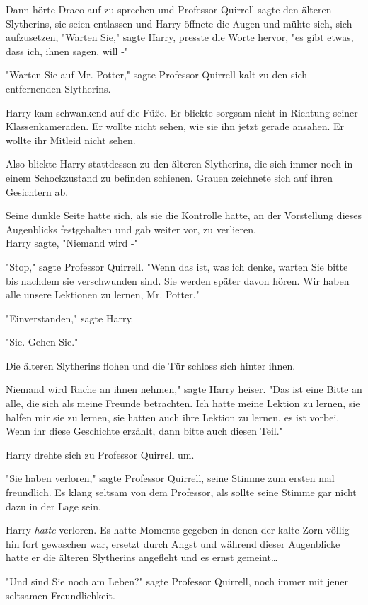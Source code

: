{Dann hörte Draco auf zu sprechen und Professor Quirrell sagte den älteren Slytherins, sie seien entlassen und Harry öffnete die Augen und mühte sich, sich aufzusetzen, "Warten Sie," sagte Harry, presste die Worte hervor, "es gibt etwas, dass ich, ihnen sagen, will -"

"Warten Sie auf Mr. Potter," sagte Professor Quirrell kalt zu den sich entfernenden Slytherins.

Harry kam schwankend auf die Füße. Er blickte sorgsam nicht in Richtung seiner Klassenkameraden. Er wollte nicht sehen, wie sie ihn jetzt gerade ansahen. Er wollte ihr Mitleid nicht sehen.

Also blickte Harry stattdessen zu den älteren Slytherins, die sich immer noch in einem Schockzustand zu befinden schienen. Grauen zeichnete sich auf ihren Gesichtern ab.

Seine dunkle Seite hatte sich, als sie die Kontrolle hatte, an der Vorstellung dieses Augenblicks festgehalten und gab weiter vor, zu verlieren.\\ Harry sagte, "Niemand wird -"

"Stop," sagte Professor Quirrell. "Wenn das ist, was ich denke, warten Sie bitte bis nachdem sie verschwunden sind. Sie werden später davon hören. Wir haben alle unsere Lektionen zu lernen, Mr. Potter."

"Einverstanden," sagte Harry.

"Sie. Gehen Sie."

Die älteren Slytherins flohen und die Tür schloss sich hinter ihnen.

Niemand wird Rache an ihnen nehmen," sagte Harry heiser. "Das ist eine Bitte an alle, die sich als meine Freunde betrachten. Ich hatte meine Lektion zu lernen, sie halfen mir sie zu lernen, sie hatten auch ihre Lektion zu lernen, es ist vorbei. Wenn ihr diese Geschichte erzählt, dann bitte auch diesen Teil."

Harry drehte sich zu Professor Quirrell um.

"Sie haben verloren," sagte Professor Quirrell, seine Stimme zum ersten mal freundlich. Es klang seltsam von dem Professor, als sollte seine Stimme gar nicht dazu in der Lage sein.

Harry \emph{hatte} verloren. Es hatte Momente gegeben in denen der kalte Zorn völlig hin fort gewaschen war, ersetzt durch Angst und während dieser Augenblicke hatte er die älteren Slytherins angefleht und es ernst gemeint…

"Und sind Sie noch am Leben?" sagte Professor Quirrell, noch immer mit jener seltsamen Freundlichkeit.

}

